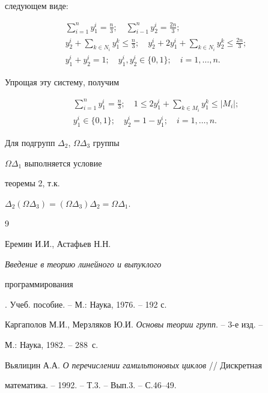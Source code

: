 следующем виде:


\begin{gather*}


\sum^n_{i=1}y^i_1=\frac{n}{3};\quad \sum^n_{i-1}y^i_2=\frac{2n}{3};\\


y^i_2+\sum_{k\in N_i}y^k_1\le\frac{n}{3};\quad


y^i_2+2y^i_1+\sum_{k\in N_i}y^k_2\le\frac{2n}{3};\\


y^i_1+y^i_2=1;\quad y^i_1,y^i_2\in\{0,1\};\quad i=1,\dotsc,n.


\end{gather*}


Упрощая эту систему, получим


\begin{gather*}


\sum^n_{i=1}y^i_1=\frac{n}{3};\quad 1\le 2y^i_1+


\sum_{k\in M_i}y^k_1\le|M_i|;\\


y^i_1\in\{0,1\};\quad y^i_2=1-y^i_1;\quad i=1,\dotsc,n.


\end{gather*}


Для подгрупп $\Delta_2$, $\Omega\Delta_3$ группы


$\Omega\Delta_1$ выполняется условие


теоремы 2, т.к.


$\Delta_2(\Omega\Delta_3)=(\Omega\Delta_3)\Delta_2=\Omega\Delta_1$.





\begin{thebibliography}{9}







Еремин И.И., Астафьев Н.Н. {\em Введение в теорию линейного и выпуклого


программирования}. Учеб. пособие. -- М.: Наука, 1976. -- 192 с.




Каргаполов М.И., Мерзляков Ю.И. {\em Основы теории групп}. -- 3-е изд. --


М.: Наука, 1982. -- 288~с.




Вьялицин А.А. {\em О перечислении гамильтоновых циклов} // Дискретная


математика. -- 1992. -- Т.3. -- Вып.3. -- С.46--49.








\end{thebibliography}





\vskip 2cm















